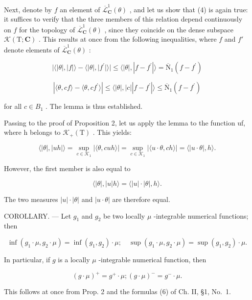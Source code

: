 Next, denote by \(f\) an element of \(\overline{\mathcal{L}}_{\mathbf{C}}^{1}(\theta)\) , and let us show that (4) is again true: it suffices to verify that the three members of this relation depend continuously on \(f\) for the topology of \(\overline{\mathcal{L}}_{\mathbf{C}}^{1}(\theta)\) , since they coincide on the dense subspace \(\mathcal{K}(\mathrm{T};\mathbf{C})\) . This results at once from the following inequalities, where \(f\) and \(f'\) denote elements of \(\overline{\mathcal{L}}_{\mathbf{C}}^{1}(\theta)\) :

\[
| \langle | \theta |, | f | \rangle - \langle | \theta |, | f ^ {\prime} | \rangle | \leqslant \langle | \theta |, | f - f ^ {\prime} | \rangle = \overline {{\mathrm{N}}} _ {1} (f - f ^ {\prime})
\]

\[
| \langle \theta , c f \rangle - \langle \theta , c f ^ {\prime} \rangle | \leqslant \langle | \theta |, | c | | f - f ^ {\prime} | \rangle \leqslant \overline {{{\mathrm{N}}}} _ {1} (f - f ^ {\prime})
\]

for all \(c \in B_{1}\) . The lemma is thus established.

Passing to the proof of Proposition 2, let us apply the lemma to the function uf, where h belongs to \(\mathcal{K}_{+}(\mathrm{T})\) . This yields:

\[
\langle | \theta |, | u h | \rangle = \sup _ {c \in \mathscr {K} _ {1}} | \langle \theta , c u h \rangle | = \sup _ {c \in \mathscr {K} _ {1}} | \langle u \cdot \theta , c h \rangle | = \langle | u \cdot \theta |, h \rangle .
\]

However, the first member is also equal to

\[
\langle | \theta |, | u | h \rangle = \langle | u | \cdot | \theta |, h \rangle .
\]

The two measures \(|u| \cdot |\theta|\) and \(|u \cdot \theta|\) are therefore equal.

COROLLARY. --- Let \(g_{1}\) and \(g_{2}\) be two locally \(\mu\) -integrable numerical functions; then

\[
\inf (g _ {1} \cdot \mu , g _ {2} \cdot \mu) = \inf (g _ {1}, g _ {2}) \cdot \mu ; \quad \sup (g _ {1} \cdot \mu , g _ {2} \cdot \mu) = \sup (g _ {1}, g _ {2}) \cdot \mu .
\]

In particular, if \(g\) is a locally \(\mu\) -integrable numerical function, then

\[
(g \cdot \mu) ^ {+} = g ^ {+} \cdot \mu ; (g \cdot \mu) ^ {-} = g ^ {-} \cdot \mu .
\]

This follows at once from Prop. 2 and the formulas (6) of Ch. II, §1, No.~1.

